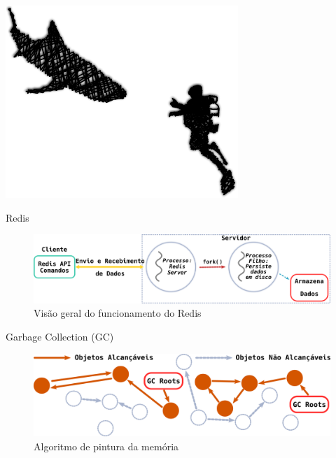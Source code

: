 \documentclass[xcolor={usenames,svgnames,dvipsnames},brazil,english,12pt,aspectratio=149]{beamer}
\begin{document}
\begin{frame}[plain]
  \includegraphics[width=.8\textwidth]{presentation_cap3_sec3}
\end{frame}

\begin{frame}{Redis}
  \begin{figure}[!h]
    \centering
    \includegraphics[width=\textwidth]{redis_overview}
    \caption*{Visão geral do funcionamento do Redis}
  \end{figure}
\end{frame}

\begin{frame}{Garbage Collection (GC)}
  \begin{figure}[!h]
    \centering
    \includegraphics[width=\textwidth]{gc_algoritmo}
    \caption*{Algoritmo de pintura da memória}
  \end{figure}
\end{frame}
\end{document}
